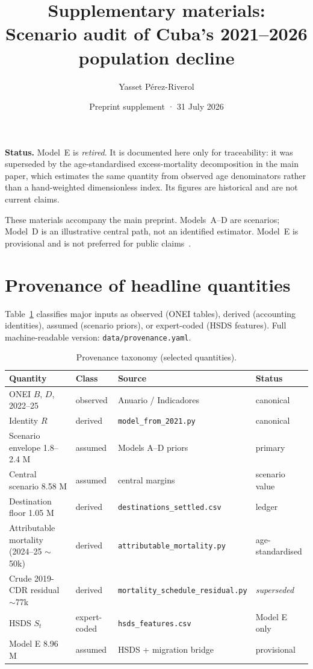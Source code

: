 \documentclass[11pt,a4paper]{article}
\title{Supplementary materials:\\
Scenario audit of Cuba's 2021--2026 population decline}
\author{Yasset P\'erez-Riverol}
\date{Preprint supplement · 31 July 2026}
\begin{document}
\maketitle

\noindent\textbf{Status.} Model~E is \emph{retired}. It is documented here only for traceability: it was superseded by the age-standardised excess-mortality decomposition in the main paper, which estimates the same quantity from observed age denominators rather than a hand-weighted dimensionless index. Its figures are historical and are not current claims.


\noindent These materials accompany the main preprint.
Models~A--D are scenarios; Model~D is an illustrative central path, not an identified estimator.
Model~E is provisional and is not preferred for public claims~\citep{repo,modele_supp}.

\section{Provenance of headline quantities}
Table~\ref{tab:prov} classifies major inputs as observed (ONEI tables), derived (accounting identities), assumed (scenario priors), or expert-coded (HSDS features).
Full machine-readable version: \texttt{data/provenance.yaml}.

\begin{table}[ht]
\centering
\caption{Provenance taxonomy (selected quantities).}
\label{tab:prov}
\begin{tabular}{llll}
\toprule
Quantity & Class & Source & Status \\
\midrule
ONEI $B$, $D$, 2022--25 & observed & Anuario / Indicadores & canonical \\
Identity $R$ & derived & \texttt{model\_from\_2021.py} & canonical \\
Scenario envelope 1.8--2.4 M & assumed & Models A--D priors & primary \\
Central scenario 8.58 M & assumed & central margins & scenario value \\
Destination floor 1.05 M & derived & \texttt{destinations\_settled.csv} & ledger \\
Attributable mortality (2024--25 $\sim$50k) & derived & \texttt{attributable\_mortality.py} & age-standardised \\
Crude 2019-CDR residual $\sim$77k & derived & \texttt{mortality\_schedule\_residual.py} & \emph{superseded} \\
HSDS $S_t$ & expert-coded & \texttt{hsds\_features.csv} & Model E only \\
Model E 8.96 M & assumed & HSDS + migration bridge & provisional \\
\bottomrule
\end{tabular}
\end{table}
\end{document}
